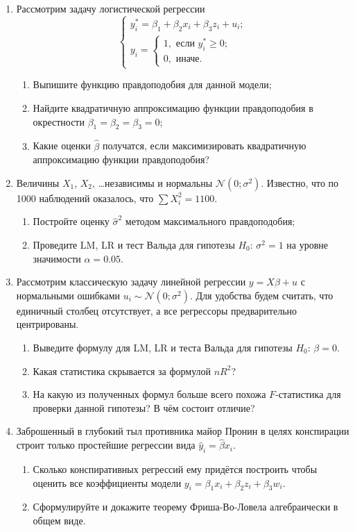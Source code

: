 \documentclass[12pt, a4paper]{article}
\def \hb{\hat{\beta}}
\def \hy{\hat{y}}
\def \cN{\mathcal{N}}
\begin{document}
\begin{enumerate}
\item Рассмотрим задачу логистической регрессии
\[
\begin{cases}
y_i^* = \beta_1 + \beta_2 x_i + \beta_3 z_i + u_i; \\
y_i = \begin{cases}
1, \text{ если } y_i^* \geq 0; \\
0, \text{ иначе.}
\end{cases}
\end{cases}
\]

\begin{enumerate}
  \item Выпишите функцию правдоподобия для данной модели;
  \item Найдите квадратичную аппроксимацию функции правдоподобия в окрестности $\beta_1=\beta_2=\beta_3 =0$;
  \item Какие оценки $\hb$ получатся, если максимизировать квадратичную аппроксимацию функции правдоподобия?
\end{enumerate}

\item Величины $X_1$, $X_2$, \ldots независимы и нормальны $\cN(0;\sigma^2)$. Известно, что по 1000 наблюдений оказалось, что $\sum X_i^2 = 1100$.

\begin{enumerate}
  \item Постройте оценку $\hat\sigma^2$ методом максимального правдоподобия;
  \item Проведите LM, LR и тест Вальда для гипотезы $H_0$: $\sigma^2 = 1$ на уровне значимости $\alpha=0.05$.
\end{enumerate}


\item Рассмотрим классическую задачу линейной регрессии $y=X\beta + u$ с нормальными ошибками $u_i\sim \cN(0;\sigma^2)$. Для удобства будем считать, что единичный столбец отсутствует, а все регрессоры предварительно центрированы.

\begin{enumerate}
  \item Выведите формулу для LM, LR и теста Вальда для гипотезы $H_0$: $\beta=0$.
  \item Какая статистика скрывается за формулой $nR^2$?
  \item На какую из полученных формул больше всего похожа $F$-статистика для проверки данной гипотезы? В чём состоит отличие?
\end{enumerate}

\item Заброшенный в глубокий тыл противника майор Пронин в целях конспирации строит только простейшие регрессии вида $\hy_i=\hb x_i$.

\begin{enumerate}
\item Сколько конспиративных регрессий ему придётся построить чтобы оценить все коэффициенты модели $y_i = \beta_1 x_i + \beta_2 z_i + \beta_3 w_i$.
\item Сформулируйте и докажите теорему Фриша-Во-Ловела алгебраически в общем виде.
\end{enumerate}

\end{enumerate}
\end{document}
